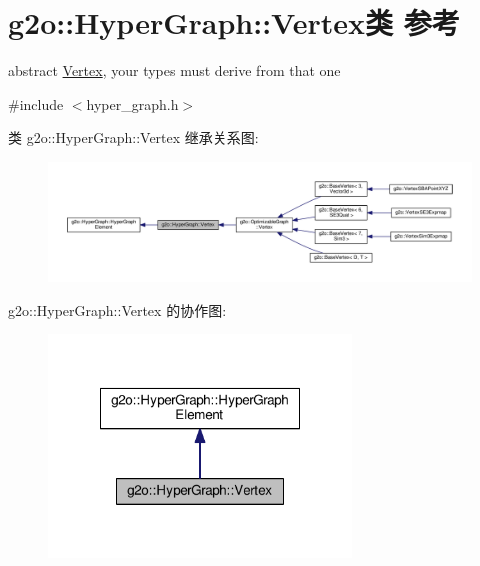 \hypertarget{classg2o_1_1HyperGraph_1_1Vertex}{\section{g2o\-:\-:Hyper\-Graph\-:\-:Vertex类 参考}
\label{classg2o_1_1HyperGraph_1_1Vertex}
}


abstract \hyperlink{classg2o_1_1HyperGraph_1_1Vertex}{Vertex}, your types must derive from that one  




{\ttfamily \#include $<$hyper\-\_\-graph.\-h$>$}



类 g2o\-:\-:Hyper\-Graph\-:\-:Vertex 继承关系图\-:
\nopagebreak
\begin{figure}[H]
\begin{center}
\leavevmode
\includegraphics[width=350pt]{classg2o_1_1HyperGraph_1_1Vertex__inherit__graph}
\end{center}
\end{figure}


g2o\-:\-:Hyper\-Graph\-:\-:Vertex 的协作图\-:
\nopagebreak
\begin{figure}[H]
\begin{center}
\leavevmode
\includegraphics[width=228pt]{classg2o_1_1HyperGraph_1_1Vertex__coll__graph}
\end{center}
\end{figure}
